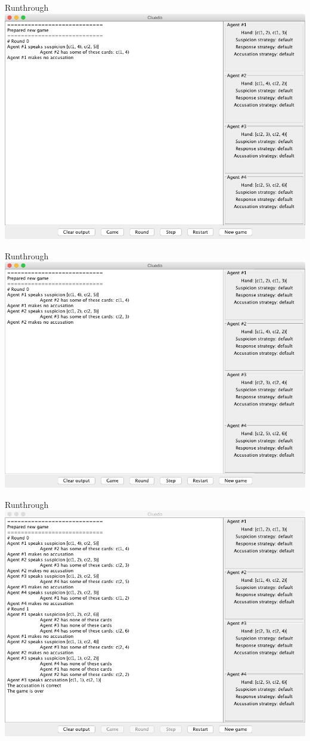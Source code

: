 \begin{frame}{Runthrough}
    \centering
    \includegraphics[height=0.8\textheight]{images/Stepped}
\end{frame}

\begin{frame}{Runthrough}
    \centering
    \includegraphics[height=0.8\textheight]{images/Step2}
\end{frame}

\begin{frame}{Runthrough}
    \centering
    \includegraphics[height=0.8\textheight]{images/Done}
\end{frame}
